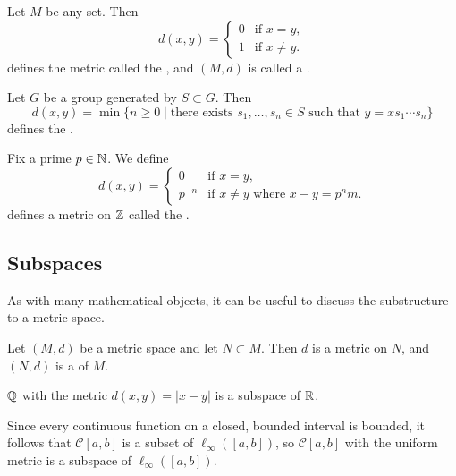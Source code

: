 \documentclass[a4paper]{scrartcl}
\begin{document}
\begin{example}
Let $M$ be any set. Then
$$
d(x, y) = \begin{cases}
    0 &\mbox{if } x = y, \\
    1 &\mbox{if } x \neq y.
   \end{cases}
$$
defines the metric called the , and $(M, d)$ is called a .
\end{example}

\begin{example}
    Let $G$ be a group generated by $S \subset G$. Then
    $$
    d(x, y) = \min \{n \geq 0 \mid \text{there exists } s_1, \dots, s_n \in S \text{ such that } y = x s_1 \cdots s_n \}
    $$
    defines the .
\end{example}

\begin{example}
    Fix a prime $p \in \mathbb{N}$. We define
    $$
    d(x, y) = \begin{cases}
        0 &\mbox{if } x = y, \\
        p^{-n} &\mbox{if } x \neq y \text{ where }x - y = p^n m.
       \end{cases}
    $$
    defines a metric on $\mathbb{Z}$ called the .
\end{example}

\subsection{Subspaces}

As with many mathematical objects, it can be useful to discuss the substructure to a metric space.

\begin{definition}[Subspace]
    Let $(M, d)$ be a metric space and let $N \subset M$. Then $d$ is a metric on $N$, and $(N, d)$ is a  of $M$.    
\end{definition}

\begin{example}[$\Q$ is a subspace of $\R$]
$\Q$ with the metric $d(x, y) = |x - y|$ is a subspace of $\R$.   
\end{example}

\begin{example}
    Since every continuous function on a closed, bounded interval is bounded, it follows that $\mathcal{C}[a, b]$ is a subset of $\ell_{\infty}([a, b])$, so $\mathcal{C}[a, b]$ with the uniform metric is a subspace of $\ell_{\infty}([a, b])$.
\end{example}
\end{document}

